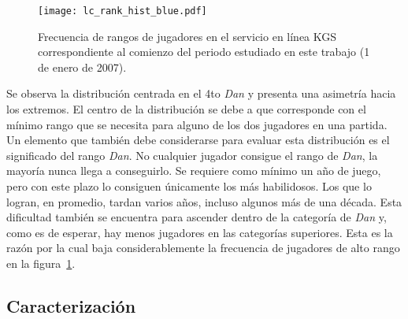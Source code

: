 \documentclass[11pt,twoside, spanish]{report} %
\begin{document}
\begin{figure}[H]
    \centering
    \texttt{[image: lc\_rank\_hist\_blue.pdf]}
    \caption{Frecuencia de rangos de jugadores en el servicio en l\'inea KGS correspondiente al comienzo del periodo estudiado en este trabajo (1 de enero de 2007).}
    \label{fig:rank_hist}
\end{figure}

Se observa la distribuci\'on  centrada en el 4to \textit{Dan} y presenta una asimetr\'ia hacia los extremos.
El centro de la distribuci\'on se debe a que corresponde con el m\'inimo rango que se necesita para alguno de los dos jugadores en una partida.
Un elemento que tambi\'en debe considerarse para evaluar esta distribuci\'on es el significado del rango \textit{Dan}.
No cualquier jugador consigue el rango de \emph{Dan}, la mayor\'ia nunca llega a conseguirlo.
Se requiere como m\'inimo un a\~no de juego, pero con este plazo lo consiguen \'unicamente los m\'as habilidosos.
Los que lo logran, en promedio, tardan varios a\~nos, incluso algunos m\'as de una d\'ecada.
Esta dificultad tambi\'en se encuentra para ascender dentro de la categor\'ia de \textit{Dan} y, como es de esperar, hay menos jugadores en las categor\'ias superiores.
Esta es la raz\'on por la cual baja considerablemente la frecuencia de jugadores de alto rango en la figura~\ref{fig:rank_hist}.








\subsection{Caracterizaci\'on}
\end{document}
